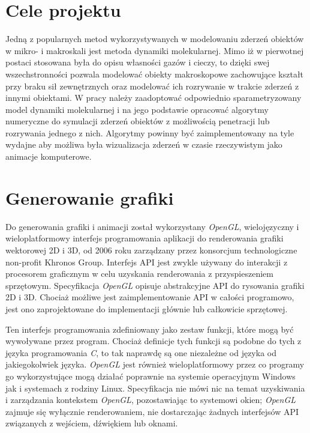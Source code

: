 \documentclass[12pt, letterpaper]{report}
\begin{document}
    \section{Cele projektu}
    Jedną z popularnych metod wykorzystywanych w modelowaniu zderzeń obiektów w mikro- i makroskali jest 
    metoda dynamiki molekularnej. Mimo iż w pierwotnej postaci stosowana była do opisu własności gazów i 
    cieczy, to dzięki swej wszechstronności pozwala modelować obiekty makroskopowe zachowujące kształt 
    przy braku sił zewnętrznych oraz modelować ich rozrywanie w trakcie zderzeń z innymi obiektami. W pracy 
    należy zaadoptować odpowiednio sparametryzowany model dynamiki molekularnej i na jego podstawie opracować 
    algorytmy numeryczne do symulacji zderzeń obiektów z możliwością penetracji lub rozrywania jednego z nich. 
    Algorytmy powinny być zaimplementowany na tyle wydajne aby możliwa była wizualizacja zderzeń w czasie 
    rzeczywistym jako animacje komputerowe.

    \section{Generowanie grafiki}
    Do generowania grafiki i animacji został wykorzystany \emph{\emph{OpenGL}}, 
    wielojęzyczny i wieloplatformowy 
    interfejs programowania aplikacji do renderowania grafiki wektorowej 2D i 3D, 
    od 2006 roku zarządzany przez konsorcjum technologiczne non-profit Khronos Group. 
    Interfejs API jest zwykle używany do interakcji 
    z procesorem graficznym w celu uzyskania renderowania z przyspieszeniem sprzętowym. 
    Specyfikacja \emph{OpenGL} opisuje abstrakcyjne API do rysowania grafiki 2D i 3D. Chociaż możliwe jest 
    zaimplementowanie API w całości programowo, jest ono zaprojektowane do implementacji głównie 
    lub całkowicie sprzętowej.

    Ten interfejs programowania zdefiniowany jako zestaw funkcji, które mogą być wywoływane przez program.
    Chociaż definicje tych funkcji są podobne do tych z języka programowania \emph{C}, to tak 
    naprawdę są one niezależne od języka od jakiegokolwiek języka. 
    \emph{OpenGL} jest również wieloplatformowy przez co programy go wykorzystujące mogą 
    działać poprawnie na systemie operacyjnym Windows jak i systemach z rodziny Linux. 
    Specyfikacja nie mówi nic na temat uzyskiwania i zarządzania kontekstem \emph{OpenGL}, 
    pozostawiając to systemowi okien; \emph{OpenGL} zajmuje się wyłącznie 
    renderowaniem, nie dostarczając żadnych interfejsów API związanych z wejściem, dźwiękiem lub oknami. \\
\end{document}
